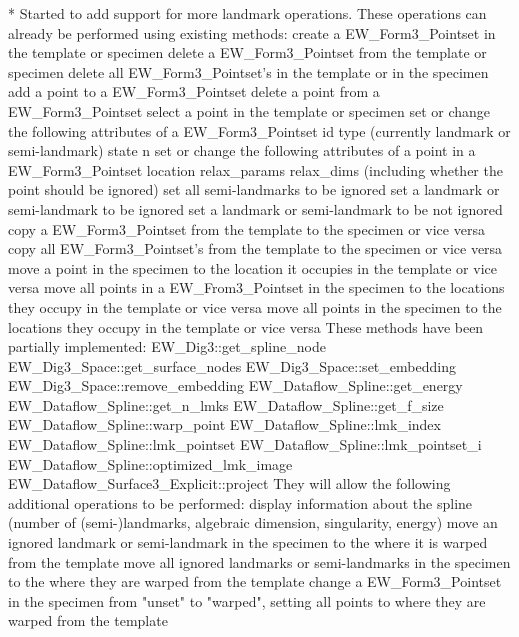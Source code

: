 \begin{DoxyVerbInclude}
    * Started to add support for more landmark operations.
    These operations can already be performed using existing methods:
        create a EW_Form3_Pointset in the template or specimen
        delete a EW_Form3_Pointset from the template or specimen
        delete all EW_Form3_Pointset's in the template or in the specimen
        add a point to a EW_Form3_Pointset
        delete a point from a EW_Form3_Pointset
        select a point in the template or specimen
        set or change the following attributes of a EW_Form3_Pointset
          id
          type (currently landmark or semi-landmark)
          state
          n
        set or change the following attributes of a point in a EW_Form3_Pointset
          location
          relax_params
          relax_dims (including whether the point should be ignored)
        set all semi-landmarks to be ignored
        set a landmark or semi-landmark to be ignored
        set a landmark or semi-landmark to be not ignored
        copy a EW_Form3_Pointset from the template to the specimen or vice versa
        copy all EW_Form3_Pointset's from the template to the specimen or vice
         versa
        move a point in the specimen to the location it occupies in the
         template or vice versa
        move all points in a EW_From3_Pointset in the specimen to the locations
         they occupy in the template or vice versa
        move all points in the specimen to the locations they occupy in the
         template or vice versa
    These methods have been partially implemented:
        EW_Dig3::get_spline_node
        EW_Dig3_Space::get_surface_nodes
        EW_Dig3_Space::set_embedding
        EW_Dig3_Space::remove_embedding
        EW_Dataflow_Spline::get_energy
        EW_Dataflow_Spline::get_n_lmks
        EW_Dataflow_Spline::get_f_size
        EW_Dataflow_Spline::warp_point
        EW_Dataflow_Spline::lmk_index
        EW_Dataflow_Spline::lmk_pointset
        EW_Dataflow_Spline::lmk_pointset_i
        EW_Dataflow_Spline::optimized_lmk_image
        EW_Dataflow_Surface3_Explicit::project
    They will allow the following additional operations to be performed:
        display information about the spline (number of (semi-)landmarks,
         algebraic dimension, singularity, energy)
        move an ignored landmark or semi-landmark in the specimen to the
         where it is warped from the template
        move all ignored landmarks or semi-landmarks in the specimen to the
         where they are warped from the template
        change a EW_Form3_Pointset in the specimen from "unset" to "warped",
         setting all points to where they are warped from the template

\end{DoxyVerbInclude}
